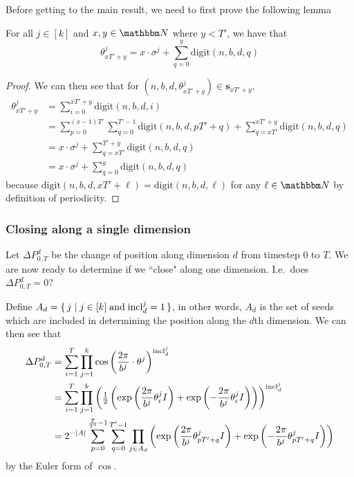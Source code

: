 \documentclass[11pt,titlepage]{article}
\newcommand{\rationalPeriodTotal}{{T}'}
\newcommand{\seedAngle}[1]{{\theta^j_{#1}}}
\newcommand{\totalPeriod}{T}
\newcommand{\inclIndic}[2]{{\mathrm{incl}_{#1}^{#2}}}
\newcommand{\numbToAngle}{\frac{2\pi}{b^j}}
\newcommand{\combSingleTerm}[1]{\prod_{j=1}^k \cos\left(\numbToAngle \cdot \theta^j\right) ^ {\inclIndic{#1}{j}}}
\newcommand{\digSumPeriodic}{\sigma^j}
\newcommand{\changeTotalOneDim}{\Delta P_{0, T}^d}
\newcommand{\digit}{\mathrm{digit}}
\begin{document}
Before getting to the main result, we need to first prove the following lemma
\begin{lemma}{For all $j \in [k]$ and $x, y \in \N$ where $y < \rationalPeriodTotal$, we have that 
  $$
    \theta_{xT' + y}^j = x\cdot \digSumPeriodic + \sum_{q = 0}^y \digit(n, b, d, q)
  $$}
  \label{lemma:angleBreakdown}
  \begin{proof}
    We can then see that for $(n, b, d, \theta_{x\rationalPeriodTotal + y}^j) \in \pmb{s}_{x\rationalPeriodTotal + y}$,
    \begin{align*}
      \seedAngle{x \rationalPeriodTotal + y} &= \sum_{i = 0}^{x \rationalPeriodTotal + y} \mathrm{digit}(n, b, d, i) \\
      &= \sum_{p = 0}^{(x- 1)\rationalPeriodTotal} \sum_{q=0}^{\rationalPeriodTotal - 1} \mathrm{digit}(n, b, d, p\rationalPeriodTotal + q)
          + \sum_{q = x \rationalPeriodTotal}^{x \rationalPeriodTotal + y} \mathrm{digit}(n, b, d, q)\\
      &= x \cdot \digSumPeriodic + \sum_{q = x \rationalPeriodTotal}^{\rationalPeriodTotal + y}\mathrm{digit}(n, b, d, q)\\
      &= x \cdot \digSumPeriodic + \sum_{q = 0}^{y}\mathrm{digit}(n, b, d, q)
    \end{align*}
    because $\mathrm{digit}(n, b, d, x\rationalPeriodTotal + \ell) = \mathrm{digit}(n, b, d, \ell)$ for any $\ell \in \N$
    by definition of periodicity.
  \end{proof}
\end{lemma}

\subsubsection{Closing along a single dimension}
Let $\changeTotalOneDim$ be the change of position along dimension $d$
from timestep 0 to $T$.
We are now ready to determine if we ``close" along one dimension. I.e.\ does
$
\changeTotalOneDim = 0
$?

Define $A_d = \set{j \mid j \in [k] \; \text{and}\; \inclIndic{d}{j} = 1}$, in other words,
$A_d$ is the set of seeds which are included in determining the position along the $d$th dimension.
We can then see that
\begin{align*}
\changeTotalOneDim &=\sum_{i = 1}^T \combSingleTerm{d}\\
  &=\sum_{i = 1}^T \prod_{j = 1}^k \left(\half \left(\exp\left({\numbToAngle \seedAngle{i} I}\right) +  \exp\left(-\numbToAngle \seedAngle{i} I\right)\right)\right)^\inclIndic{d}{j}\\
  &= 2^{-|A|} \sum_{p= 0}^{\frac{\totalPeriod}{\rationalPeriodTotal} - 1} \sum_{q = 0}^{\rationalPeriodTotal - 1}
    \prod_{j \in A_d} \left(
      \exp\left(\numbToAngle\seedAngle{p \rationalPeriodTotal + q} I\right) +  \exp\left(-\numbToAngle\seedAngle{p \rationalPeriodTotal + q} I\right)\right)
\end{align*}
by the Euler form of $\cos$.
\end{document}
